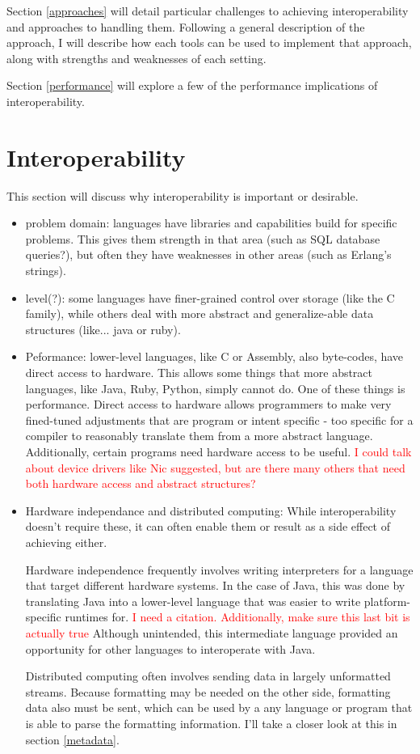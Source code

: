\documentclass{sig-alternate}
\newcommand{\mycomment}[1]{\textcolor{red}{#1}}
\begin{document}
Section \ref{approaches} will detail particular challenges to achieving interoperability and approaches to handling them. Following a general description of the approach, I will describe how each tools can be used to implement that approach, along with strengths and weaknesses of each setting.

Section \ref{performance} will explore a few of the performance implications of interoperability.


\section{Interoperability}\label{Interop}
This section will discuss why interoperability is important or desirable.
\begin{itemize}
	\item problem domain: languages have libraries and capabilities build for specific problems. This gives them strength in that area (such as SQL database queries?), but often they have weaknesses in other areas (such as Erlang's strings).
	\item level(?): some languages have finer-grained control over storage (like the C family), while others deal with more abstract and generalize-able data structures (like... java or ruby).
	
	\item Peformance: lower-level languages, like C or Assembly, also byte-codes, have direct access to hardware. This allows some things that more abstract languages, like Java, Ruby, Python, simply cannot do. One of these things is performance. Direct access to hardware allows programmers to make very fined-tuned adjustments that are program or intent specific - too specific for a compiler to reasonably translate them from a more abstract language.
	Additionally, certain programs need hardware access to be useful. \mycomment{I could talk about device drivers like Nic suggested, but are there many others that need both hardware access and abstract structures?}
		
	\item Hardware independance and distributed computing: While interoperability doesn't require these, it can often enable them or result as a side effect of achieving either.
	
	Hardware independence frequently involves writing interpreters for a language that target different hardware systems. In the case of Java, this was done by translating Java into a lower-level language that was easier to write platform-specific runtimes for.
	\mycomment{I need a citation. Additionally, make sure this last bit is actually true}
	Although unintended, this intermediate language provided an opportunity for other languages to interoperate with Java.	
	
	Distributed computing often involves sending data in largely unformatted streams. Because formatting may be needed on the other side, formatting data also must be sent, which can be used by a any language or program that is able to parse the formatting information. I'll take a closer look at this in section \ref{metadata}.
\end{itemize}
\end{document}
